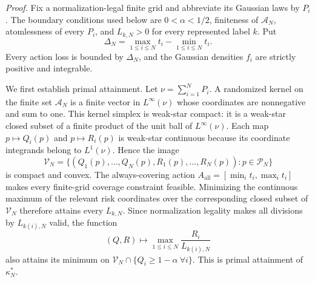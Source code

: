 \textit{Proof.}
Fix a normalization-legal finite grid and abbreviate its Gaussian laws by \(P_i\).  The boundary conditions used below are \(0<\alpha<1/2\), finiteness of \(\mathcal A_N\), atomlessness of every \(P_i\), and \(L_{k,N}>0\) for every represented label \(k\).  Put
\[
 \Delta_N=\max_{1\leq i\leq N}t_i-
          \min_{1\leq i\leq N}t_i.
\]
Every action loss is bounded by \(\Delta_N\), and the Gaussian densities \(f_i\) are strictly positive and integrable.

We first establish primal attainment.  Let \(\nu=\sum_{i=1}^NP_i\).  A randomized kernel on the finite set \(\mathcal A_N\) is a finite vector in \(L^\infty(\nu)\) whose coordinates are nonnegative and sum to one.  This kernel simplex is weak-star compact: it is a weak-star closed subset of a finite product of the unit ball of \(L^\infty(\nu)\).  Each map \(p\mapsto Q_i(p)\) and \(p\mapsto R_i(p)\) is weak-star continuous because its coordinate integrands belong to \(L^1(\nu)\).  Hence the image
\[
 \mathcal V_N=\{(Q_1(p),\ldots,Q_N(p),R_1(p),\ldots,R_N(p)):p\in\mathcal P_N\}
\]
is compact and convex.  The always-covering action
\(A_{\mathrm{all}}=[\min_i t_i,\max_i t_i]\) makes every finite-grid coverage constraint feasible.  Minimizing the continuous maximum of the relevant risk coordinates over the corresponding closed subset of \(\mathcal V_N\) therefore attains every \(L_{k,N}\).  Since normalization legality makes all divisions by \(L_{k(i),N}\) valid, the function
\[
 (Q,R)\longmapsto\max_{1\leq i\leq N}
 \frac{R_i}{L_{k(i),N}}
\]
also attains its minimum on \(\mathcal V_N\cap\{Q_i\geq1-\alpha\ \forall i\}\).  This is primal attainment of \(\kappa_N^*\).

